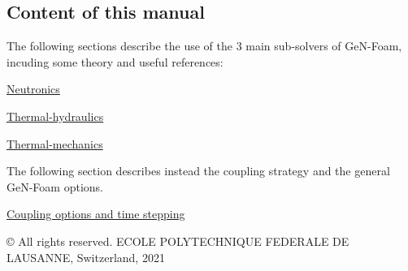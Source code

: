 \subsection*{Content of this manual}

The following sections describe the use of the 3 main sub-\/solvers of Ge\+N-\/\+Foam, incuding some theory and useful references\+:
\begin{DoxyItemize}
\item \hyperlink{NEUTRONICS}{Neutronics}
\item \hyperlink{TH}{Thermal-\/hydraulics}
\item \hyperlink{TM}{Thermal-\/mechanics}
\end{DoxyItemize}

The following section describes instead the coupling strategy and the general Ge\+N-\/\+Foam options.


\begin{DoxyItemize}
\item \hyperlink{COUPLING}{Coupling options and time stepping}
\end{DoxyItemize}

© All rights reserved. E\+C\+O\+LE P\+O\+L\+Y\+T\+E\+C\+H\+N\+I\+Q\+UE F\+E\+D\+E\+R\+A\+LE DE L\+A\+U\+S\+A\+N\+NE, Switzerland, 2021 
